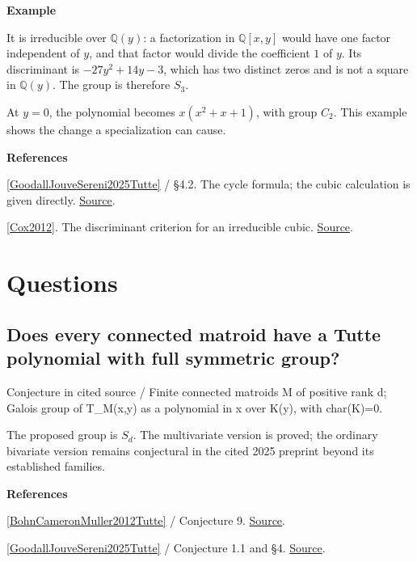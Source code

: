 \documentclass[11pt,a4paper,oneside,openany]{book}
\newcommand{\atlasdisplay}[1]{\par\begingroup\centering\vspace{3pt}\noindent\adjustbox{max width=\linewidth}{\(\displaystyle #1\)}\par\vspace{5pt}\endgroup}
\newenvironment{sources}{\par\smallskip\begingroup\footnotesize\color{atlasgray}\leftskip=10pt\setlength{\parskip}{2pt}}{\par\endgroup\smallskip}
\begin{document}
\begin{atlasblock}[standard]
\textbf{\sffamily Example}\par\smallskip

\atlasdisplay{T_{C_4}(x,y)=x^3+x^2+x+y.}
\color{black} It is irreducible over \(\mathbb Q(y)\): a factorization in \(\mathbb Q[x,y]\) would have one factor independent of \(y\), and that factor would divide the coefficient \(1\) of \(y\). Its discriminant is \(-27y^2+14y-3\), which has two distinct zeros and is not a square in \(\mathbb Q(y)\). The group is therefore \(S_3\).\par
\color{black} At \(y=0\), the polynomial becomes \(x(x^2+x+1)\), with group \(C_2\). This example shows the change a specialization can cause.\par
\end{atlasblock}\color{black}
\begin{sources}
\textbf{References}\par\smallskip
\noindent\hyperlink{ref:GoodallJouveSereni2025Tutte}{[GoodallJouveSereni2025Tutte]} / §4.2. The cycle formula; the cubic calculation is given directly. \href{https://arxiv.org/abs/2510.05658}{Source}.\par
\noindent\hyperlink{ref:Cox2012}{[Cox2012]}. The discriminant criterion for an irreducible cubic. \href{https://onlinelibrary.wiley.com/doi/book/10.1002/9781118218457}{Source}.\par
\end{sources}\color{black}
\section*{Questions}
\subsection*{Does every connected matroid have a Tutte polynomial with full symmetric group?}
{\small\sffamily\color{atlasgold}Conjecture in cited source / Finite connected matroids M of positive rank d; Galois group of T\_\allowbreak{}M(x,y) as a polynomial in x over K(y), with char(K)=0.}\par\smallskip
\color{black} The proposed group is \(S_d\). The multivariate version is proved; the ordinary bivariate version remains conjectural in the cited 2025 preprint beyond its established families.\par
\begin{sources}
\textbf{References}\par\smallskip
\noindent\hyperlink{ref:BohnCameronMuller2012Tutte}{[BohnCameronMuller2012Tutte]} / Conjecture 9.  \href{https://doi.org/10.1007/s10801-011-0332-2}{Source}.\par
\noindent\hyperlink{ref:GoodallJouveSereni2025Tutte}{[GoodallJouveSereni2025Tutte]} / Conjecture 1.1 and §4.  \href{https://arxiv.org/abs/2510.05658}{Source}.\par
\end{sources}\color{black}
\end{document}
